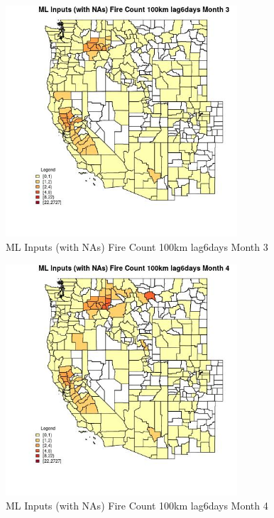 \begin{figure} 
\centering  
\includegraphics[width=0.77\textwidth]{Code_Outputs/Report_ML_input_PM25_Step4_part_f_de_duplicated_aves_prioritize_24hr_obswNAs_CountyFire_Count_100km_lag6daysmedianMonth3.jpg} 
\caption{\label{fig:Report_ML_input_PM25_Step4_part_f_de_duplicated_aves_prioritize_24hr_obswNAsCountyFire_Count_100km_lag6daysmedianMonth3}ML Inputs (with NAs) Fire Count 100km lag6days Month 3} 
\end{figure} 
 

\begin{figure} 
\centering  
\includegraphics[width=0.77\textwidth]{Code_Outputs/Report_ML_input_PM25_Step4_part_f_de_duplicated_aves_prioritize_24hr_obswNAs_CountyFire_Count_100km_lag6daysmedianMonth4.jpg} 
\caption{\label{fig:Report_ML_input_PM25_Step4_part_f_de_duplicated_aves_prioritize_24hr_obswNAsCountyFire_Count_100km_lag6daysmedianMonth4}ML Inputs (with NAs) Fire Count 100km lag6days Month 4} 
\end{figure} 
 

